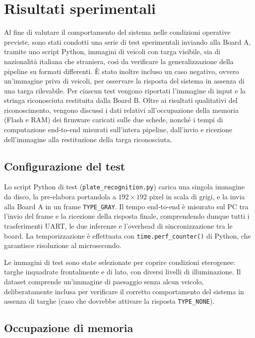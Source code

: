 \chapter{Risultati sperimentali}
\label{cap:risultati}

Al fine di valutare il comportamento del sistema nelle condizioni operative previste, sono stati condotti una serie di test sperimentali inviando alla Board A, tramite uno script Python, immagini di veicoli con targa visibile, sia di nazionalità italiana che straniera, così da verificare la generalizzazione della pipeline su formati differenti. È stato inoltre incluso un caso negativo, ovvero un'immagine priva di veicoli, per osservare la risposta del sistema in assenza di una targa rilevabile. Per ciascun test vengono riportati l'immagine di input e la stringa riconosciuta restituita dalla Board B. Oltre ai risultati qualitativi del riconoscimento, vengono discussi i dati relativi all'occupazione della memoria (Flash e RAM) dei firmware caricati sulle due schede, nonché i tempi di computazione end-to-end misurati sull'intera pipeline, dall'invio e ricezione dell'immagine alla restituzione della targa riconosciuta.

\section{Configurazione del test}
\label{sec:test-setup}

Lo script Python di test (\texttt{plate\_recognition.py}) carica una singola immagine da disco, la pre-elabora portandola a $192\times192$ pixel in scala di grigi, e la invia alla Board A in un frame \texttt{TYPE\_GRAY}. Il tempo end-to-end è misurato sul PC tra l'invio del frame e la ricezione della risposta finale, comprendendo dunque tutti i trasferimenti UART, le due inferenze e l'overhead di sincronizzazione tra le board. La temporizzazione è effettuata con \texttt{time.perf\_counter()} di Python, che garantisce risoluzione al microsecondo.

Le immagini di test sono state selezionate per coprire condizioni eterogenee: targhe inquadrate frontalmente e di lato, con diversi livelli di illuminazione. Il dataset comprende un'immagine di paesaggio senza alcun veicolo, deliberatamente inclusa per verificare il corretto comportamento del sistema in assenza di targhe (caso che dovrebbe attivare la risposta \texttt{TYPE\_NONE}).

\section{Occupazione di memoria}
\label{sec:memoria-occupazione}

